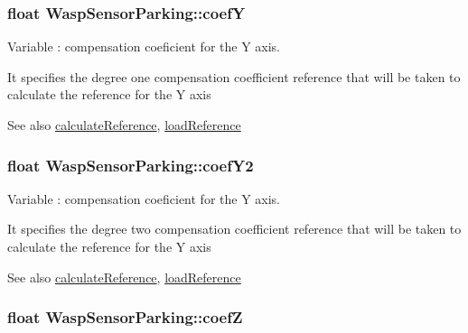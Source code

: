 \subsubsection[{\texorpdfstring{coefY}{coefY}}]{\setlength{\rightskip}{0pt plus 5cm}float Wasp\+Sensor\+Parking\+::coefY}\hypertarget{class_wasp_sensor_parking_a8cca7bd7e2127e65e43a93809d361cbe}{}\label{class_wasp_sensor_parking_a8cca7bd7e2127e65e43a93809d361cbe}


Variable \+: compensation coeficient for the Y axis. 

It specifies the degree one compensation coefficient reference that will be taken to calculate the reference for the Y axis \begin{DoxySeeAlso}{See also}
\hyperlink{class_wasp_sensor_parking_a8fe1255a714fed88684a89363963eb02}{calculate\+Reference}, \hyperlink{class_wasp_sensor_parking_ada85f8d26b42a4a6733c0e1d1880a4ad}{load\+Reference} 
\end{DoxySeeAlso}
\subsubsection[{\texorpdfstring{coef\+Y2}{coefY2}}]{\setlength{\rightskip}{0pt plus 5cm}float Wasp\+Sensor\+Parking\+::coef\+Y2}\hypertarget{class_wasp_sensor_parking_a0b8dc5b606eac7d2a1294d2c2d3388c6}{}\label{class_wasp_sensor_parking_a0b8dc5b606eac7d2a1294d2c2d3388c6}


Variable \+: compensation coeficient for the Y axis. 

It specifies the degree two compensation coefficient reference that will be taken to calculate the reference for the Y axis \begin{DoxySeeAlso}{See also}
\hyperlink{class_wasp_sensor_parking_a8fe1255a714fed88684a89363963eb02}{calculate\+Reference}, \hyperlink{class_wasp_sensor_parking_ada85f8d26b42a4a6733c0e1d1880a4ad}{load\+Reference} 
\end{DoxySeeAlso}
\subsubsection[{\texorpdfstring{coefZ}{coefZ}}]{\setlength{\rightskip}{0pt plus 5cm}float Wasp\+Sensor\+Parking\+::coefZ}\hypertarget{class_wasp_sensor_parking_a1d49e5a81bb3f865134f43c41df4a5f2}{}\label{class_wasp_sensor_parking_a1d49e5a81bb3f865134f43c41df4a5f2}



